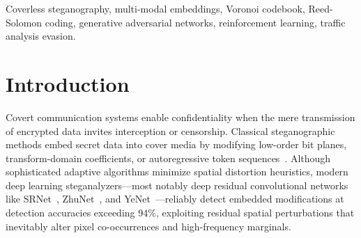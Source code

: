 \documentclass[11pt,journal,onecolumn]{IEEEtran}\linespread{1.3}
\begin{document}
\begin{abstract}
We evaluate DCASS across five orthogonal threat dimensions under an audited empirical protocol. Against deep residual steganalyzers trained to detect spatial perturbations at 93.7\% to 95.1\% accuracy, DCASS carriers yield chance-level detection with measured receiver operating characteristic area under curve values between 0.4973 and 0.4993, with every 95\% confidence interval spanning 0.5000. In semantic distributional tests across 1,536 coordinate dimensions, zero coordinates reject under Benjamini-Hochberg false discovery control, and cluster histograms confirm alignment with the system structural mechanism at permutation $p = 0.208$. The dynamic codec delivers 13.50 to 13.66 coded bits per carrier, representing a 40.7\% to 49.9\% carrier reduction relative to exact Voronoi baseline schemes, with user payload capacity scaling up to 12.90 bits per carrier, while achieving zero false acceptances across 356 wrong-key forgery tests. Evaluated against a calibrated network traffic sequence detector trained on authentic human conversation sessions from public community discussion data, the closed-loop reinforcement learning scheduler achieves 76.0\% evasion at 5.63 seconds mean latency with zero channel cooldown violations, whereas static, Poisson, and unguided generative baselines are intercepted at 100\%.
\end{abstract}

\begin{IEEEkeywords}
Coverless steganography, multi-modal embeddings, Voronoi codebook, Reed-Solomon coding, generative adversarial networks, reinforcement learning, traffic analysis evasion.
\end{IEEEkeywords}

\section{Introduction}

Covert communication systems enable confidentiality when the mere transmission of encrypted data invites interception or censorship. Classical steganographic methods embed secret data into cover media by modifying low-order bit planes, transform-domain coefficients, or autoregressive token sequences~\cite{provos2003hide,fridrich2009steganography}. Although sophisticated adaptive algorithms minimize spatial distortion heuristics, modern deep learning steganalyzers—most notably deep residual convolutional networks like SRNet~\cite{boroumand2018deep}, ZhuNet~\cite{zhang2019run}, and YeNet~\cite{ye2017deep}—reliably detect embedded modifications at detection accuracies exceeding 94\%, exploiting residual spatial perturbations that inevitably alter pixel co-occurrences and high-frequency marginals.
\end{document}
